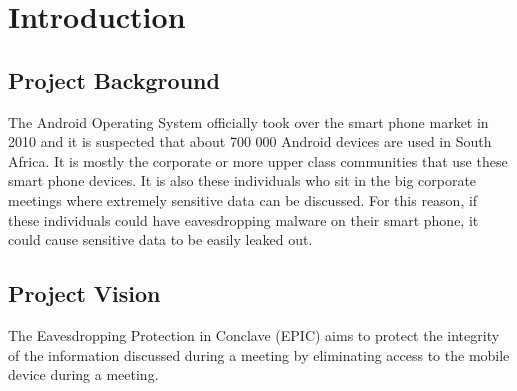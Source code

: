 \begin{comment}
\documentclass[a4paper,12pt,titlepage]{article}
\usepackage{verbatim}
\usepackage{graphicx}
\usepackage[utf8]{inputenc}
\usepackage{hyperref}
\DeclareGraphicsExtensions{.jpg}
\graphicspath{{./Images/}}
\end{comment}



%
	
	
\newpage
\tableofcontents
\newpage
	\section{Introduction}
	\subsection{Project Background}

The Android Operating System officially took over the smart phone market in 2010 and it is suspected that about 700 000 Android devices are used in South Africa. It is mostly the corporate or more upper class communities that use these smart phone devices. It is also these individuals who sit in the big corporate meetings where extremely sensitive data can be discussed. For this reason, if these individuals could have eavesdropping malware on their smart phone, it could cause sensitive data to be easily leaked out.


	\subsection{Project Vision} 
	The Eavesdropping Protection in Conclave (EPIC) aims to protect the integrity of the information discussed during a meeting by eliminating access to the mobile device during a meeting.

